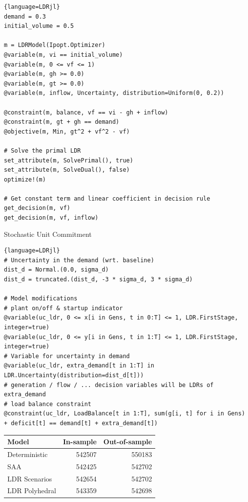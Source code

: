 \documentclass[a0paper,fontscale=0.285]{baposter} %
\begin{document}
\begin{poster}
\begin{posterbox}[name=example1,column=0,span=2,below=reformulation]
\begin{multicols}{2}
\begin{lstlisting}{language=LDRjl}
demand = 0.3
initial_volume = 0.5

m = LDRModel(Ipopt.Optimizer)
@variable(m, vi == initial_volume)
@variable(m, 0 <= vf <= 1)
@variable(m, gh >= 0.0)
@variable(m, gt >= 0.0)
@variable(m, inflow, Uncertainty, distribution=Uniform(0, 0.2))

@constraint(m, balance, vf == vi - gh + inflow)
@constraint(m, gt + gh == demand)
@objective(m, Min, gt^2 + vf^2 - vf)

# Solve the primal LDR
set_attribute(m, SolvePrimal(), true)
set_attribute(m, SolveDual(), false)
optimize!(m)

# Get constant term and linear coefficient in decision rule
get_decision(m, vf)
get_decision(m, vf, inflow)
  \end{lstlisting}
  \end{multicols}
\end{posterbox}


\begin{posterbox}[name=example2,column=0,span=2,below=example1]
{Stochastic Unit Commitment}
  { \footnotesize
  \begin{lstlisting}{language=LDRjl}
# Uncertainty in the demand (wrt. baseline)
dist_d = Normal.(0.0, sigma_d)
dist_d = truncated.(dist_d, -3 * sigma_d, 3 * sigma_d)

# Model modifications
# plant on/off & startup indicator
@variable(uc_ldr, 0 <= x[i in Gens, t in 0:T] <= 1, LDR.FirstStage, integer=true)
@variable(uc_ldr, 0 <= y[i in Gens, t in 1:T] <= 1, LDR.FirstStage, integer=true)
# Variable for uncertainty in demand
@variable(uc_ldr, extra_demand[t in 1:T] in LDR.Uncertainty(distribution=dist_d[t]))
# generation / flow / ... decision variables will be LDRs of extra_demand
# load balance constraint
@constraint(uc_ldr, LoadBalance[t in 1:T], sum(g[i, t] for i in Gens) + deficit[t] == demand[t] + extra_demand[t])
  \end{lstlisting} }

  \begin{center}
    \begin{tabular}{lrr}
      \toprule
      Model & In-sample & Out-of-sample \\ \midrule
      Deterministic  & 542507 & 550183 \\
      SAA            & 542425 & 542702 \\
      LDR Scenarios  & 542654 & 542702 \\
      LDR Polyhedral & 543359 & 542698 \\ \bottomrule
    \end{tabular}
  \end{center}


\end{posterbox}
\end{poster}
\end{document}
